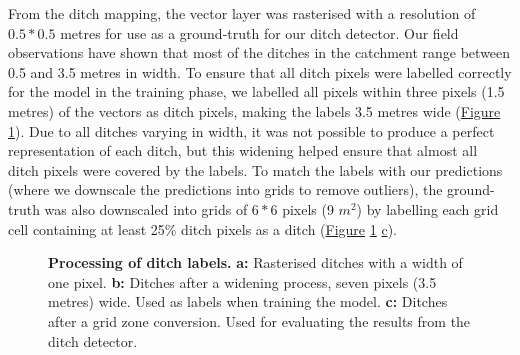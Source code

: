 \documentclass[11pt, review]{elsarticle} %
\begin{document}
From the ditch mapping, the vector layer was rasterised with a resolution of $0.5*0.5$ metres for use as a ground-truth for our ditch detector. Our field observations have shown that most of the ditches in the catchment range between 0.5 and 3.5 metres in width. To ensure that all ditch pixels were labelled correctly for the model in the training phase, we labelled all pixels within three pixels (1.5 metres) of the vectors as ditch pixels, making the labels 3.5 metres wide (\hyperref[fig:ditchpreprocess]{Figure} \ref{fig:ditchpreprocess}). Due to all ditches varying in width, it was not possible to produce a perfect representation of each ditch, but this widening helped ensure that almost all ditch pixels were covered by the labels. To match the labels with our predictions (where we downscale the predictions into grids to remove outliers), the ground-truth was also downscaled into grids of $6*6$ pixels (9 $m^2$) by labelling each grid cell containing at least 25\% ditch pixels as a ditch (\hyperref[fig:ditchpreprocess]{Figure} \ref{fig:ditchpreprocess} \hyperref[fig:ditchpreprocess]{c}).

\begin{figure} [!htb]
    \centering
    \hspace{5pt}
    \caption{\textbf{Processing of ditch labels.} \textbf{a: }Rasterised ditches with a width of one pixel. \textbf{b: }Ditches after a widening process, seven pixels (3.5 metres) wide. Used as labels when training the model. \textbf{c: }Ditches after a grid zone conversion. Used for evaluating the results from the ditch detector.} \label{sample-figure}
    \label{fig:ditchpreprocess}
\end{figure}
\end{document}

